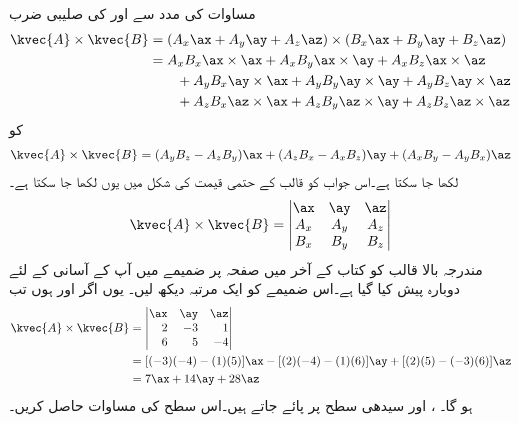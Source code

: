 مساوات  کی  مدد سے  اور  کی صلیبی ضرب
\begin{align*}
\kvec{A} \times \kvec{B}&=(A_x\ax+A_y\ay+A_z\az) \times (B_x\ax+B_y\ay+B_z\az)\\
&=A_x B_x \ax \times \ax+A_x B_y \ax \times \ay+A_x B_z \ax \times \az\\
& \quad \quad +A_y B_x \ay \times \ax+A_y B_y \ay \times \ay+A_y B_z \ay \times \az \\
&\quad \quad +A_z B_x \az \times \ax+A_z B_y \az \times \ay+A_z B_z \az \times \az
\end{align*}
کو
\begin{align}
\kvec{A} \times \kvec{B}=(A_y B_z-A_z B_y)\ax+(A_z B_x-A_x B_z)\ay+(A_x B_y-A_y B_x)\az
\end{align}
لکھا جا سکتا ہے۔اس جواب کو قالب کے حتمی قیمت کی شکل میں یوں لکھا جا سکتا ہے۔
\begin{align}\label{مساوات_سمتیات_سمتی_ضرب_قالب_شکل}
\kvec{A} \times \kvec{B}=\begin{vmatrix}
\ax & \ay & \az\\
A_x & A_y & A_z\\
B_x & B_y & B_z
\end{vmatrix}
\end{align}
مندرجہ بالا قالب کو کتاب کے آخر میں صفحہ  پر ضمیمے میں آپ کے آسانی کے لئے دوبارہ پیش کیا گیا ہے۔اس ضمیمے کو ایک مرتبہ دیکھ لیں۔
یوں اگر  اور  ہوں تب
\begin{align*}
\kvec{A} \times \kvec{B}&=\begin{vmatrix*}[r]
\ax & \ay & \az\\
2 & -3 & 1\\
6 & 5 & -4
\end{vmatrix*}\\
&=[(-3)(-4)-(1)(5)]\ax-[(2)(-4)-(1)(6)]\ay+[(2)(5)-(-3)(6)]\az\\
&=7\ax+14\ay+28\az
\end{align*}
ہو گا۔
،  اور  سیدھی سطح پر پائے جاتے ہیں۔اس سطح کی مساوات حاصل کریں۔

